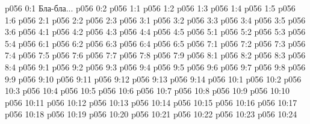 \author{Могущественный Посланник и Макивента Мелхиседек}
\vs p056 0:1  Бла-бла...
\vs p056 0:2 
\vs p056 1:1 
\vs p056 1:2 \pc 
\vs p056 1:3 
\vs p056 1:4 \pc 
\vs p056 1:5 
\vs p056 1:6 
\vs p056 2:1 
\vs p056 2:2 
\vs p056 2:3 
\vs p056 3:1 
\vs p056 3:2 
\vs p056 3:3 \pc 
\vs p056 3:4 
\vs p056 3:5 \pc 
\vs p056 3:6 
\vs p056 4:1 
\vs p056 4:2 
\vs p056 4:3 
\vs p056 4:4 \pc 
\vs p056 4:5 
\vs p056 5:1 
\vs p056 5:2 \pc 
\vs p056 5:3 
\vs p056 5:4 \pc 
{}
\vs p056 6:1 
\vs p056 6:2 
\vs p056 6:3 \pc 
\vs p056 6:4 
\vs p056 6:5 
\vs p056 7:1 
\vs p056 7:2 
\vs p056 7:3 \pc 
\vs p056 7:4 \pc 
\vs p056 7:5 
\vs p056 7:6 
\vs p056 7:7 \pc 
\vs p056 7:8 
\vs p056 7:9 
\vs p056 8:1 
\vs p056 8:2 
\vs p056 8:3 
\vs p056 8:4 
\vs p056 9:1 
\vs p056 9:2 \pc 
\vs p056 9:3 
\vs p056 9:4 
\vs p056 9:5 
\vs p056 9:6 \pc 
\vs p056 9:7 
\vs p056 9:8 
\vs p056 9:9 
\vs p056 9:10 \pc 
\vs p056 9:11 
\vs p056 9:12 
\vs p056 9:13 
\vs p056 9:14 
\vs p056 10:1 
\vs p056 10:2 
\vs p056 10:3 \pc 
\vs p056 10:4 
\vs p056 10:5 
\vs p056 10:6 
\vs p056 10:7 
\vs p056 10:8 
\vs p056 10:9 \pc 
\vs p056 10:10 
\vs p056 10:11 
\vs p056 10:12 
\vs p056 10:13 \pc 
\vs p056 10:14 
\vs p056 10:15 
\vs p056 10:16 
\vs p056 10:17 \pc 
\vs p056 10:18 
\vs p056 10:19 
\vs p056 10:20 \pc 
\vs p056 10:21 \pc 
\vsetoff
\vs p056 10:22 
\vs p056 10:23 
\vs p056 10:24 
\quizlink
